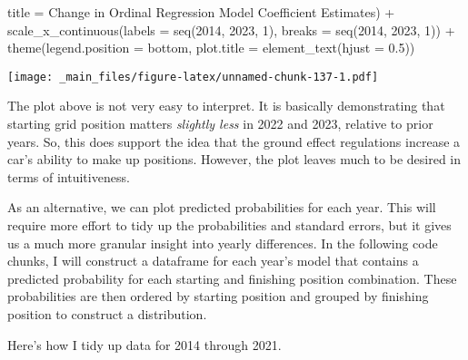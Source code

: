 \documentclass[
]{book}
\newenvironment{Shaded}{\begin{snugshade}}{\end{snugshade}}
\newcommand{\AttributeTok}[1]{\textcolor[rgb]{0.77,0.63,0.00}{#1}}
\newcommand{\DecValTok}[1]{\textcolor[rgb]{0.00,0.00,0.81}{#1}}
\newcommand{\FloatTok}[1]{\textcolor[rgb]{0.00,0.00,0.81}{#1}}
\newcommand{\FunctionTok}[1]{\textcolor[rgb]{0.00,0.00,0.00}{#1}}
\newcommand{\NormalTok}[1]{#1}
\newcommand{\SpecialCharTok}[1]{\textcolor[rgb]{0.00,0.00,0.00}{#1}}
\newcommand{\StringTok}[1]{\textcolor[rgb]{0.31,0.60,0.02}{#1}}
\begin{document}
\begin{Shaded}
\begin{Highlighting}[]
       \AttributeTok{title =} \StringTok{\textquotesingle{}Change in Ordinal Regression Model Coefficient Estimates\textquotesingle{}}\NormalTok{) }\SpecialCharTok{+}
  \FunctionTok{scale\_x\_continuous}\NormalTok{(}\AttributeTok{labels =} \FunctionTok{seq}\NormalTok{(}\DecValTok{2014}\NormalTok{, }\DecValTok{2023}\NormalTok{, }\DecValTok{1}\NormalTok{),}
                     \AttributeTok{breaks =} \FunctionTok{seq}\NormalTok{(}\DecValTok{2014}\NormalTok{, }\DecValTok{2023}\NormalTok{, }\DecValTok{1}\NormalTok{)) }\SpecialCharTok{+}
  \FunctionTok{theme}\NormalTok{(}\AttributeTok{legend.position =} \StringTok{\textquotesingle{}bottom\textquotesingle{}}\NormalTok{,}
        \AttributeTok{plot.title =} \FunctionTok{element\_text}\NormalTok{(}\AttributeTok{hjust =} \FloatTok{0.5}\NormalTok{))}
\end{Highlighting}
\end{Shaded}

\texttt{[image: \_main\_files/figure-latex/unnamed-chunk-137-1.pdf]}

The plot above is not very easy to interpret. It is basically demonstrating that starting grid position matters \emph{slightly less} in 2022 and 2023, relative to prior years. So, this does support the idea that the ground effect regulations increase a car's ability to make up positions. However, the plot leaves much to be desired in terms of intuitiveness.

As an alternative, we can plot predicted probabilities for each year. This will require more effort to tidy up the probabilities and standard errors, but it gives us a much more granular insight into yearly differences. In the following code chunks, I will construct a dataframe for each year's model that contains a predicted probability for each starting and finishing position combination. These probabilities are then ordered by starting position and grouped by finishing position to construct a distribution.

Here's how I tidy up data for 2014 through 2021.
\end{document}
